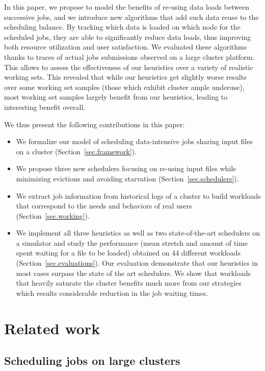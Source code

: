\documentclass[sigconf,review,anonymous]{acmart}
\begin{document}
In this paper, we propose to model the benefits of re-using data loads
between successive jobs, and we introduce new algorithms that add such
data reuse to the scheduling balance. By tracking which data is loaded
on which node for the scheduled jobs, they are able to significantly
reduce data loads, thus improving both resource utilization and user
satisfaction. We evaluated these algorithms thanks to traces of actual
jobs submissions observed on a large cluster platform. This allows to
assess the effectiveness of our heuristics over a variety of realistic
working sets. This revealed that while our heuristics get slightly worse
results over some working set samples (those which exhibit cluster ample
underuse), most working set samples largely benefit from our heuristics,
leading to interesting benefit overall.

We thus present the following contributions in this paper:
\begin{itemize}
	\item We formalize our model of scheduling data-intensive jobs sharing input files on a cluster (Section~\ref{sec.framework}).
	\item We propose three new schedulers focusing on re-using input files while minimizing evictions and avoiding starvation (Section~\ref{sec.schedulers}).
	\item We extract job information from historical logs of a cluster to build workloads that correspond to the needs and behaviors of real users (Section~\ref{sec.working}).
	\item We implement all three heuristics as well as two state-of-the-art schedulers on a simulator and study the performance (mean stretch and amount of time spent waiting for a file to be loaded) obtained on 44 different workloads (Section~\ref{sec.evaluations}).
	Our evaluation demonstrate that our heuristics in most cases surpass the state of the art schedulers.
	We show that workloads that heavily saturate the cluster
                benefits much more from our strategies which results
                considerable reduction in the job waiting times.
\end{itemize}

\section{Related work}\label{sec.related_work}

\subsection{Scheduling jobs on large clusters}
\end{document}
